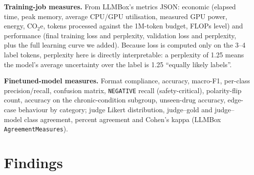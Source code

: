 \documentclass[11pt]{article}
\newcommand{\code}[1]{\texttt{#1}}
\begin{document}
\textbf{Training-job measures.} From LLMBox's metrics JSON: economic (elapsed time, peak memory, average CPU/GPU utilisation, measured GPU power, energy, CO$_2$e, tokens processed against the 1M-token budget, FLOPs level) and performance (final training loss and perplexity, validation loss and perplexity, plus the full learning curve we added). Because loss is computed only on the 3--4 label tokens, perplexity here is directly interpretable: a perplexity of 1.25 means the model's average uncertainty over the label is 1.25 ``equally likely labels''.

\textbf{Finetuned-model measures.} Format compliance, accuracy, macro-F1, per-class precision/recall, confusion matrix, \code{NEGATIVE} recall (safety-critical), polarity-flip count, accuracy on the chronic-condition subgroup, unseen-drug accuracy, edge-case behaviour by category; judge Likert distribution, judge--gold and judge--model class agreement, percent agreement and Cohen's kappa (LLMBox \code{AgreementMeasures}).

\section{Findings}
\end{document}

